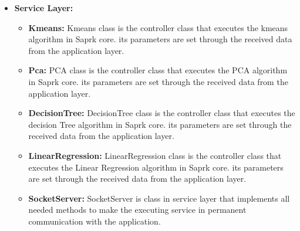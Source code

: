 \begin{itemize}
\item \textbf{Service Layer:}\\
\begin{itemize}
\item \textbf{Kmeans:} Kmeans class is the controller class that executes the kmeans algorithm in Saprk core. its parameters are set through the received data from the application layer.\\
\item \textbf{Pca:} PCA class is the controller class that executes the PCA algorithm in Saprk core. its parameters are set through the received data from the application layer.\\
\item \textbf{DecisionTree:} DecisionTree class is the controller class that executes the decision Tree algorithm in Saprk core. its parameters are set through the received data from the application layer.\\
\item \textbf{LinearRegression:} LinearRegression class is the controller class that executes the Linear Regression algorithm in Saprk core. its parameters are set through the received data from the application layer.\\
\item \textbf{SocketServer:} SocketServer is class in service layer that implements all needed methods to make the executing service in permanent communication with the application.\\
\end{itemize}


\end{itemize}
